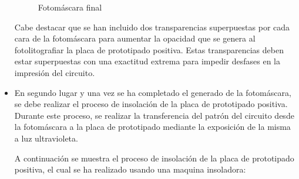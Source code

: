 \begin{itemize}
    \begin{figure}[H]
    \centering
    \caption{Fotomáscara final} \label{fig:lego}
    \end{figure}
    
    Cabe destacar que se han incluido dos transparencias superpuestas por cada cara de la fotomáscara para aumentar la opacidad que se genera al fotolitografiar la placa de prototipado positiva. Estas transparencias deben estar superpuestas con una exactitud extrema para impedir desfases en la impresión del circuito.
    
    
    \item En segundo lugar y una vez se ha completado el generado de la fotomáscara, se debe realizar el proceso de insolación de la placa de prototipado positiva. Durante este proceso, se realizar la transferencia del patrón del circuito desde la fotomáscara a la placa de prototipado mediante la exposición de la misma a luz ultravioleta.
    
    A continuación se muestra el proceso de insolación de la placa de prototipado positiva, el cual se ha realizado usando una maquina insoladora:
    

\end{itemize}
